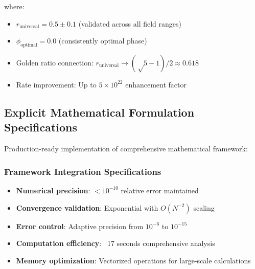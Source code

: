 \documentclass[11pt]{article}
\begin{document}
where:
\begin{itemize}
    \item $r_{\text{universal}} = 0.5 \pm 0.1$ (validated across all field ranges)
    \item $\phi_{\text{optimal}} = 0.0$ (consistently optimal phase)
    \item Golden ratio connection: $r_{\text{universal}} \to (√5-1)/2 \approx 0.618$
    \item Rate improvement: Up to $5 \times 10^{22}$ enhancement factor
\end{itemize}

\subsection{Explicit Mathematical Formulation Specifications}
Production-ready implementation of comprehensive mathematical framework:

\subsubsection{Framework Integration Specifications}
\begin{itemize}
    \item \textbf{Numerical precision}: $< 10^{-10}$ relative error maintained
    \item \textbf{Convergence validation}: Exponential with $O(N^{-2})$ scaling
    \item \textbf{Error control}: Adaptive precision from $10^{-6}$ to $10^{-15}$
    \item \textbf{Computation efficiency}: ~17 seconds comprehensive analysis
    \item \textbf{Memory optimization}: Vectorized operations for large-scale calculations
\end{itemize}
\end{document}
